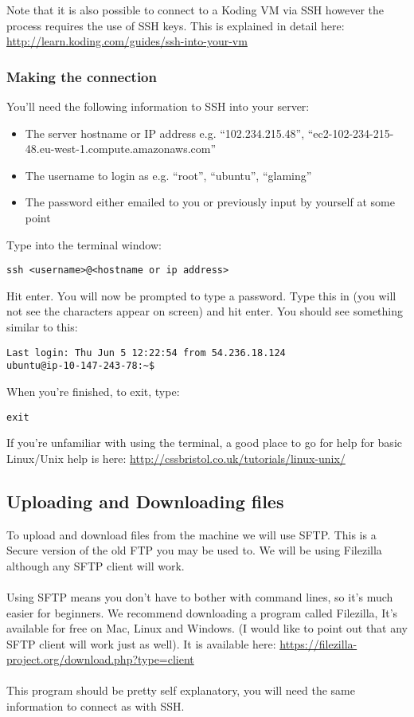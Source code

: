 \documentclass[twocolumn]{article}
\begin{document}
Note that it is also possible to connect to a Koding VM via SSH however the process requires the use of SSH keys. This is explained in detail here: \url{http://learn.koding.com/guides/ssh-into-your-vm}

\subsubsection{Making the connection}
\label{sec:MakingTheConnection}

You'll need the following information to SSH into your server:
\begin{itemize}
\item The server hostname or IP address e.g. ``102.234.215.48'', ``ec2-102-234-215-48.eu-west-1.compute.amazonaws.com'' 
\item The username to login as e.g. ``root'', ``ubuntu'', ``glaming''
\item The password either emailed to you or previously input by yourself at some point
\end{itemize}

Type into the terminal window:

\begin{lstlisting}
ssh <username>@<hostname or ip address>
\end{lstlisting}
Hit enter. You will now be prompted to type a password. Type this in (you will not see the characters appear on screen) and hit enter. You should see something similar to this:

\begin{lstlisting}
Last login: Thu Jun 5 12:22:54 from 54.236.18.124
ubuntu@ip-10-147-243-78:~$
\end{lstlisting}
When you're finished, to exit, type:
\begin{lstlisting}
exit
\end{lstlisting}

If you're unfamiliar with using the terminal, a good place to go for help for basic Linux/Unix help is here: \url{http://cssbristol.co.uk/tutorials/linux-unix/}

\subsection{Uploading and Downloading files}

To upload and download files from the machine we will use SFTP. This is a Secure version of the old FTP you may be used to. We will be using Filezilla although any SFTP client will work.\\
\\
Using SFTP means you don't have to bother with command lines, so it's much easier for beginners. We recommend downloading a program called Filezilla, It's available for free on Mac, Linux and Windows. (I would like to point out that any SFTP client will work just as well). It is available here: \url{https://filezilla-project.org/download.php?type=client}\\
\\
This program should be pretty self explanatory, you will need the same information to connect as with SSH.
\end{document}
